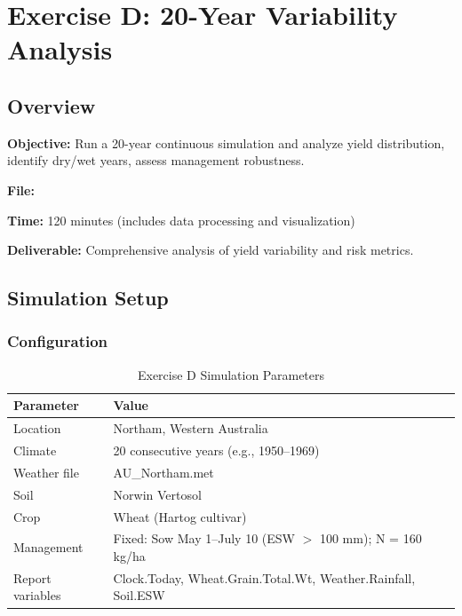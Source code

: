 
\chapter{Exercise D: 20-Year Variability Analysis}
\label{ch:exercise-d}

\section{Overview}

\textbf{Objective:} Run a 20-year continuous simulation and analyze yield distribution, identify dry/wet years, assess management robustness.

\textbf{File:} 

\textbf{Time:} 120 minutes (includes data processing and visualization)

\textbf{Deliverable:} Comprehensive analysis of yield variability and risk metrics.

\section{Simulation Setup}

\subsection{Configuration}

\begin{table}[H]
\centering
\caption{Exercise D Simulation Parameters}
\label{tab:exercise-d-setup}
\begin{tabularx}{\textwidth}{l|X}
\toprule
\textbf{Parameter} & \textbf{Value} \\
\midrule
Location & Northam, Western Australia \\
Climate & 20 consecutive years (e.g., 1950--1969) \\
Weather file & AU\_Northam.met \\
Soil & Norwin Vertosol \\
Crop & Wheat (Hartog cultivar) \\
Management & Fixed: Sow May 1--July 10 (ESW $>$ 100 mm); N = 160 kg/ha \\
Report variables & Clock.Today, Wheat.Grain.Total.Wt, Weather.Rainfall, Soil.ESW \\
\bottomrule
\end{tabularx}
\end{table}

